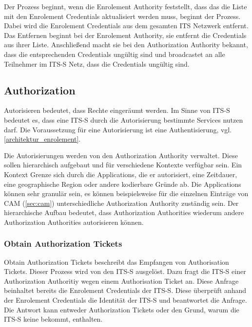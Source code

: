 Der Prozess beginnt, wenn die Enrolement Authority feststellt, dass das die Liste mit den Enrolement Credentials aktualisiert werden muss, beginnt der Prozess. Dabei wird die Enrolement Credentials aus dem gesamten \ac{ITS} Netzwerk entfernt. Das Entfernen beginnt bei der  Enrolement Authority, sie entfernt die Credentials aus ihrer Liste. Anschließend macht sie bei den    Authorization Authority bekannt, dass die entsprechenden Credentials ungültig sind und broadcastet an alle Teilnehmer im \ac{ITS-S} Netz, dass die Credentials ungültig sind.


\subsection{Authorization \label{architektur_authorization}}
Autorisieren bedeutet, dass Rechte eingeräumt werden. Im Sinne von \ac{ITS-S} bedeutet es, dass eine \ac{ITS-S} durch die Autorisierung bestimmte Services nutzen darf. Die Voraussetzung für eine Autorisierung ist eine Authentisierung, vgl. \autoref{architektur_enrolement}. 

Die Autorisierungen werden von den Authorization Authority verwaltet. Diese sollen hierarchisch aufgebaut und für verschiedene Kontexte verfügbar sein. Ein Kontext Grenze sich durch die  Applications, die er autorisiert, eine Zeitdauer, eine geographische Region oder andere  kodierbare Gründe ab. Die Applications können sehr granulär sein, es können beispielsweise für die einzelnen Einträge von \ac{CAM} (\autoref{sec:cam}) unterschiedliche Authorization Authority zuständig sein. Der hierarchische Aufbau bedeutet, dass Authorization Authorities wiederum andere Authorization Authorities autorisieren können.

\subsubsection{Obtain Authorization Tickets \label{architektur_obtain-authorisation-tickets}}
Obtain Authorization Tickets beschreibt das Empfangen von Authorisation Tickets. Dieser Prozess wird von den \ac{ITS-S} ausgelöst. Dazu fragt die \ac{ITS-S} einer Authorization Authoritiy wegen einem Authorisation Ticket an. Diese Anfrage beinhaltet bereits die Enrolement Credentials der \ac{ITS-S}. Diese überprüft anhand der Enrolement Credentials die Identität der \ac{ITS-S} und beantwortet die Anfrage. Die Antwort kann entweder  Authorization Tickets oder den Grund, warum die \ac{ITS-S} keine bekommt, enthalten.



